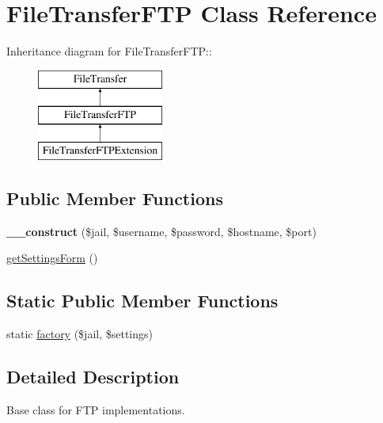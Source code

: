 \hypertarget{classFileTransferFTP}{
\section{FileTransferFTP Class Reference}
\label{classFileTransferFTP}
}
Inheritance diagram for FileTransferFTP::\begin{figure}[H]
\begin{center}
\leavevmode
\includegraphics[height=3cm]{classFileTransferFTP}
\end{center}
\end{figure}
\subsection*{Public Member Functions}
\begin{DoxyCompactItemize}
\item 
\hypertarget{classFileTransferFTP_a029fb852860f8508346fc584ea1702f5}{
{\bfseries \_\-\_\-construct} (\$jail, \$username, \$password, \$hostname, \$port)}
\label{classFileTransferFTP_a029fb852860f8508346fc584ea1702f5}

\item 
\hyperlink{classFileTransferFTP_a01948a51036c8bf682bc084f2457986b}{getSettingsForm} ()
\end{DoxyCompactItemize}
\subsection*{Static Public Member Functions}
\begin{DoxyCompactItemize}
\item 
static \hyperlink{classFileTransferFTP_a9357dd94f01df328dc19645decdf0485}{factory} (\$jail, \$settings)
\end{DoxyCompactItemize}


\subsection{Detailed Description}
Base class for FTP implementations. 


